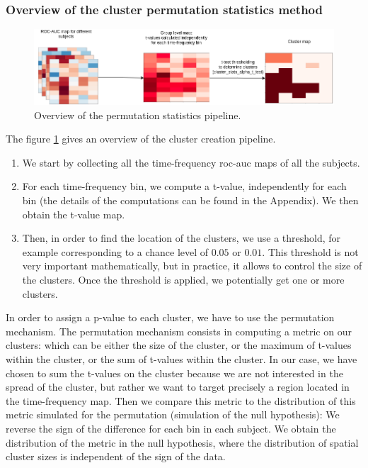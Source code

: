 \subsubsection{Overview of the cluster permutation statistics method}

\begin{figure}[ht]
    \centering
    \includegraphics[width=15cm]{images_report/sensor/Permutation_statistics.png}
    \caption[Overview of the permutation statistics pipeline.]%
    {Overview of the permutation statistics pipeline.}
    \label{permutation_statistics_pipeline}
\end{figure}

The figure \ref{permutation_statistics_pipeline} gives an overview of the cluster creation pipeline.
\begin{enumerate}
    \item We start by collecting all the time-frequency roc-auc maps of all the subjects.
    \item For each time-frequency bin, we compute a t-value, independently for each bin (the details of the computations can be found in the Appendix). We then obtain the t-value map.
    \item Then, in order to find the location of the clusters, we use a threshold, for example corresponding to a chance level of $0.05$ or $0.01$. This threshold is not very important mathematically, but in practice, it allows to control the size of the clusters. Once the threshold is applied, we potentially get one or more clusters.
\end{enumerate}

In order to assign a p-value to each cluster, we have to use the permutation mechanism. The permutation mechanism consists in computing a metric on our clusters: which can be either the size of the cluster, or the maximum of t-values within the cluster, or the sum of t-values within the cluster. In our case, we have chosen to sum the t-values on the cluster because we are not interested in the spread of the cluster, but rather we want to target precisely a region located in the time-frequency map. Then we compare this metric to the distribution of this metric simulated for the permutation (simulation of the null hypothesis):
We reverse the sign of the difference for each bin in each subject. We obtain the distribution of the metric in the null hypothesis, where the distribution of spatial cluster sizes is independent of the sign of the data.

